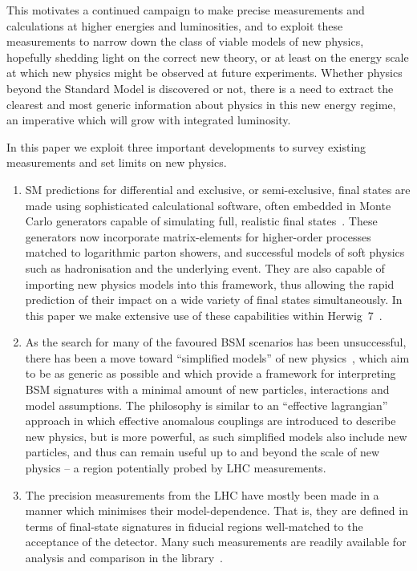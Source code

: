 \documentclass[floatfix]{article}
\begin{document}
This motivates a continued campaign to make precise measurements and calculations at higher energies and 
luminosities, and to exploit these measurements to narrow down the class of viable models of new physics, 
hopefully shedding light on the correct new theory, or at least on the energy scale at which
new physics might be observed at future experiments. Whether physics beyond the Standard Model is discovered 
or not, there is a need to extract the clearest and most generic information about physics in this new energy regime,
an imperative which will grow with integrated luminosity. 

In this paper we exploit three important developments to survey existing measurements and set 
limits on new physics. 

\begin{enumerate}
\item
SM predictions for differential and exclusive, or semi-exclusive, final states are made using sophisticated 
calculational software, often embedded in Monte Carlo generators capable of simulating full, realistic final 
states~\cite{Buckley:2011ms}. These generators now incorporate matrix-elements for higher-order processes
matched to logarithmic parton showers, and successful models of soft physics such as hadronisation and
the underlying event. They are also capable of importing new physics models into this framework, thus allowing
the rapid prediction of their impact on a wide variety of final states simultaneously. 
In this paper we make extensive use of these capabilities within Herwig~7~\cite{Bellm:2015jjp,Bahr:2008pv}.
\item
As the search for many of the favoured BSM scenarios has been unsuccessful, there has been a move toward 
``simplified models'' of new physics~\cite{Alves:2011wf,Abercrombie:2015wmb}, which aim to be as generic as possible 
and which provide a framework for interpreting BSM signatures with a minimal amount of 
new particles, interactions and model assumptions. The philosophy is similar to an ``effective lagrangian'' approach in which effective anomalous
couplings are introduced to describe new physics, but is more powerful, as such simplified models also
include new particles, and thus can remain useful up to and beyond the scale of new physics -- a region 
potentially probed by LHC measurements.
\item
The precision measurements from the LHC have mostly been made in a manner which minimises their model-dependence. 
That is, they are defined in terms of final-state signatures in fiducial regions well-matched to the
acceptance of the detector. Many such measurements are readily available for analysis and
comparison in the \rivet library~\cite{Buckley:2010ar}. 
\end{enumerate}
\end{document}
